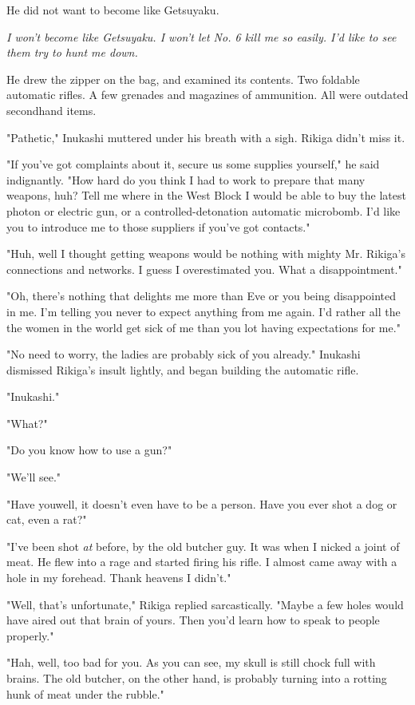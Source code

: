 He did not want to become like Getsuyaku.

\emph{I won't become like Getsuyaku. I won't let No. 6 kill me so easily. I'd
like to see them try to hunt me down.}

He drew the zipper on the bag, and examined its contents. Two foldable
automatic rifles. A few grenades and magazines of ammunition. All were
outdated secondhand items.

"Pathetic," Inukashi muttered under his breath with a sigh. Rikiga
didn't miss it.

"If you've got complaints about it, secure us some supplies yourself,"
he said indignantly. "How hard do you think I had to work to prepare
that many weapons, huh? Tell me where in the West Block I would be able
to buy the latest photon or electric gun, or a controlled-detonation
automatic microbomb. I'd like you to introduce me to those suppliers if
you've got contacts."

"Huh, well I thought getting weapons would be nothing with mighty Mr.
Rikiga's connections and networks. I guess I overestimated you. What a
disappointment."

"Oh, there's nothing that delights me more than Eve or you being
disappointed in me. I'm telling you never to expect anything from me
again. I'd rather all the the women in the world get sick of me than you
lot having expectations for me."

"No need to worry, the ladies are probably sick of you already."
Inukashi dismissed Rikiga's insult lightly, and began building the
automatic rifle.

"Inukashi."

"What?"

"Do you know how to use a gun?"

"We'll see."

"Have you\el well, it doesn't even have to be a person. Have you ever
shot a dog or cat, even a rat?"

"I've been shot \emph{at} before, by the old butcher guy. It was when I nicked
a joint of meat. He flew into a rage and started firing his rifle. I
almost came away with a hole in my forehead. Thank heavens I didn't."

"Well, that's unfortunate," Rikiga replied sarcastically. "Maybe a few
holes would have aired out that brain of yours. Then you'd learn how to
speak to people properly."

"Hah, well, too bad for you. As you can see, my skull is still chock
full with brains. The old butcher, on the other hand, is probably
turning into a rotting hunk of meat under the rubble."

